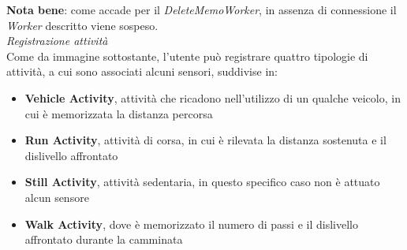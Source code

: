 \documentclass{article}
\begin{document}
    \textbf{Nota bene}: come accade per il \textit{DeleteMemoWorker}, in assenza di connessione il \textit{Worker} descritto viene sospeso. \vspace*{7pt}\\
    \textit{Registrazione attività} \vspace*{7pt}\\
    Come da immagine sottostante, l'utente può registrare quattro tipologie di attività, a cui sono associati alcuni sensori, suddivise in:
    \begin{itemize}
        \renewcommand{\labelitemi}{-}
        \item \textbf{Vehicle Activity}, attività che ricadono nell'utilizzo di un qualche veicolo, in cui è memorizzata la distanza percorsa
        \item \textbf{Run Activity}, attività di corsa, in cui è rilevata la distanza sostenuta e il dislivello affrontato
        \item \textbf{Still Activity}, attività sedentaria, in questo specifico caso non è attuato alcun sensore
        \item \textbf{Walk Activity}, dove è memorizzato il numero di passi e il dislivello affrontato durante la camminata
    \end{itemize}
\end{document}
